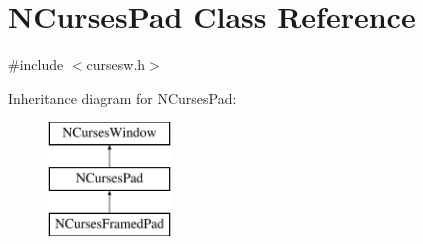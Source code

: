 \hypertarget{class_n_curses_pad}{\section{N\-Curses\-Pad Class Reference}
\label{class_n_curses_pad}
}


{\ttfamily \#include $<$cursesw.\-h$>$}

Inheritance diagram for N\-Curses\-Pad\-:\begin{figure}[H]
\begin{center}
\leavevmode
\includegraphics[height=3.000000cm]{class_n_curses_pad}
\end{center}
\end{figure}

